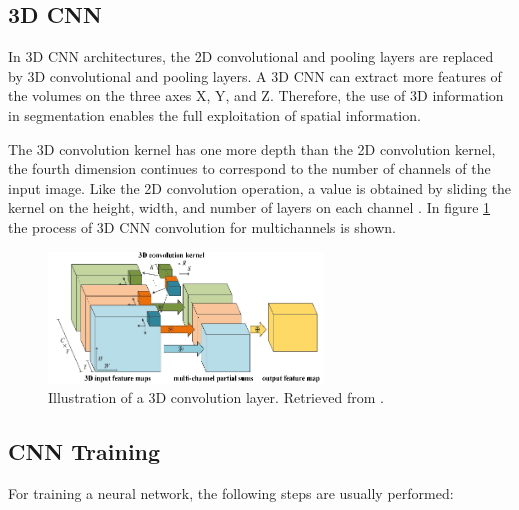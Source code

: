 \subsection*{\ac{3D} \ac{CNN}}
\label{subsection:3dcnn}
In \ac{3D} \ac{CNN} architectures, the \ac{2D} convolutional and pooling layers are replaced by \ac{3D} convolutional and pooling layers. A \ac{3D} \ac{CNN} can extract more features of the volumes on the three axes X, Y, and Z. Therefore, the use of \ac{3D} information in segmentation enables the full exploitation of spatial information.

The \ac{3D} convolution kernel has one more depth than the \ac{2D} convolution kernel, the fourth dimension continues to correspond to the number of channels of the input image. Like the \ac{2D} convolution operation, a value is obtained by sliding the kernel on the height, width, and number of layers on each channel \cite{2018guide}. In figure \ref{fig:cnn_3D} the process of \ac{3D} \ac{CNN} convolution for multichannels is shown.

\begin{figure}[!htb]
  \centering
  \includegraphics[width=0.65\textwidth]{Images/3dconv.jpg}
  \caption[Illustration of a \ac{3D} convolution layer]{Illustration of a \ac{3D} convolution layer. Retrieved from \cite{CNN:3D}.}
  \label{fig:cnn_3D}
\end{figure}


\subsection{CNN Training}

For training a neural network, the following steps are usually performed:

